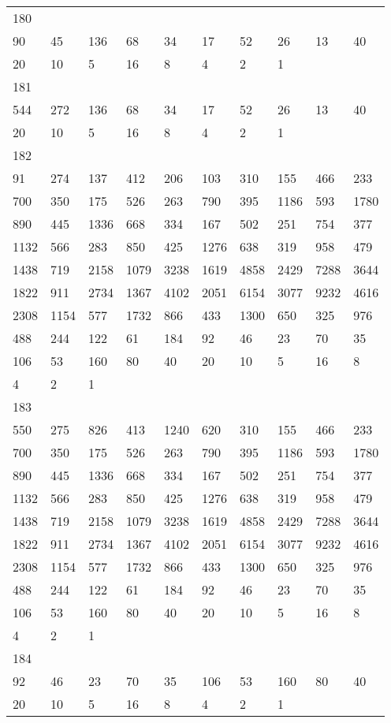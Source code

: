 \begin{longtable}{*{10}{l}}
180&&&&&&&&&\\
90& 45& 136& 68& 34& 17& 52& 26& 13& 40\\
20& 10& 5& 16& 8& 4& 2& 1& \\

181&&&&&&&&&\\
544& 272& 136& 68& 34& 17& 52& 26& 13& 40\\
20& 10& 5& 16& 8& 4& 2& 1& \\

182&&&&&&&&&\\
91& 274& 137& 412& 206& 103& 310& 155& 466& 233\\
700& 350& 175& 526& 263& 790& 395& 1186& 593& 1780\\
890& 445& 1336& 668& 334& 167& 502& 251& 754& 377\\
1132& 566& 283& 850& 425& 1276& 638& 319& 958& 479\\
1438& 719& 2158& 1079& 3238& 1619& 4858& 2429& 7288& 3644\\
1822& 911& 2734& 1367& 4102& 2051& 6154& 3077& 9232& 4616\\
2308& 1154& 577& 1732& 866& 433& 1300& 650& 325& 976\\
488& 244& 122& 61& 184& 92& 46& 23& 70& 35\\
106& 53& 160& 80& 40& 20& 10& 5& 16& 8\\
4& 2& 1& \\

183&&&&&&&&&\\
550& 275& 826& 413& 1240& 620& 310& 155& 466& 233\\
700& 350& 175& 526& 263& 790& 395& 1186& 593& 1780\\
890& 445& 1336& 668& 334& 167& 502& 251& 754& 377\\
1132& 566& 283& 850& 425& 1276& 638& 319& 958& 479\\
1438& 719& 2158& 1079& 3238& 1619& 4858& 2429& 7288& 3644\\
1822& 911& 2734& 1367& 4102& 2051& 6154& 3077& 9232& 4616\\
2308& 1154& 577& 1732& 866& 433& 1300& 650& 325& 976\\
488& 244& 122& 61& 184& 92& 46& 23& 70& 35\\
106& 53& 160& 80& 40& 20& 10& 5& 16& 8\\
4& 2& 1& \\

184&&&&&&&&&\\
92& 46& 23& 70& 35& 106& 53& 160& 80& 40\\
20& 10& 5& 16& 8& 4& 2& 1& \\


\end{longtable}
